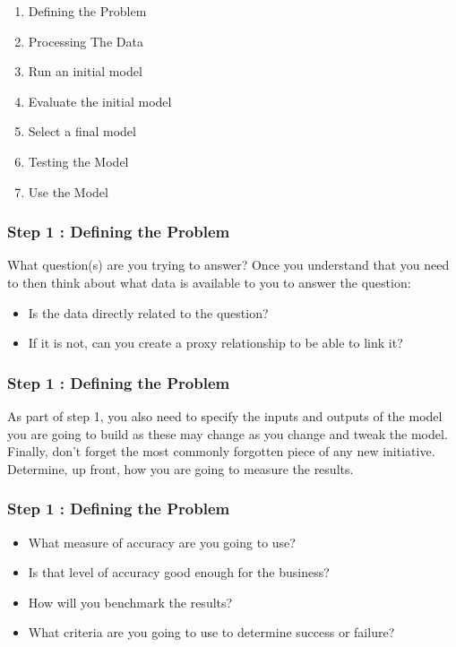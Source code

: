 \documentclass[PredictiveAnalytics101.tex]{subfiles}
\begin{document}
\begin{frame}
\Large
\begin{enumerate}
\item Defining the Problem
\item Processing The Data
\item Run an initial model
\item Evaluate the initial model
\item Select a final model
\item Testing the Model
\item Use the Model
\end{enumerate}
\end{frame}
\begin{frame}
\frametitle{Step 1 : Defining the Problem}
\Large
What question(s) are you trying to answer? Once you
understand that you need to then think about what data is available to you to answer the question:

\begin{itemize}
\item Is the data directly related to the question?
\item If it is not, can you create a proxy relationship to be able to link it?
\end{itemize}

\end{frame}
\begin{frame}
\frametitle{Step 1 : Defining the Problem}
\Large
As part of step 1, you also need to specify the inputs and outputs of the model you are going to build as
these may change as you change and tweak the model. Finally, don’t forget the most commonly
forgotten piece of any new initiative. Determine, up front, how you are going to measure the results.
\end{frame}
\begin{frame}
	\frametitle{Step 1 : Defining the Problem}
	\Large
\begin{itemize}
\item What measure of accuracy are you going to use? 
\item Is that level of accuracy good enough for
the business?
\item How will you benchmark the results?
\item  What criteria are you going to use to determine success or failure?
\end{itemize}
\end{frame}
\end{document}
